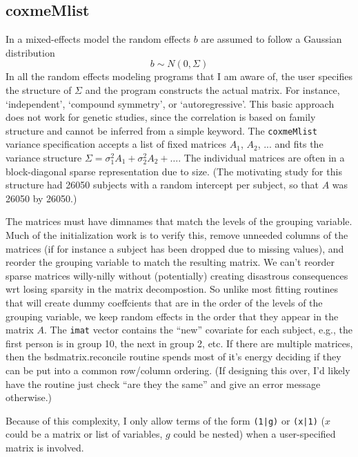 \documentclass{article}
\begin{document}
\subsection{coxmeMlist}
In a mixed-effects model the random effects $b$ are assumed to
follow a Gaussian distribution
$$
  b \sim N(0, \Sigma)
$$
In all the random effects modeling programs that I am aware of,
the user specifies the structure of $\Sigma$ and the program
constructs the actual matrix.  
For instance, `independent', `compound symmetry', or `autoregressive'.
This basic approach does not work for genetic studies, since the
correlation is based on family structure and cannot be inferred from
a simple keyword.
The \Verb!coxmeMlist! variance specification accepts a list of
fixed matrices $A_1$, $A_2$, ... and fits the variance
structure $\Sigma = \sigma_1^2 A_1 + \sigma_2^2 A_2 + \ldots$.
The individual matrices are often in a block-diagonal sparse 
representation due to size.
(The motivating study for this structure had 26050 subjects with a
random intercept per subject, so that $A$ was 26050 by 26050.)

The matrices must have dimnames that match the levels of the 
grouping variable.  Much of the initialization work is to verify
this, remove unneeded columns of the matrices (if for instance a
subject has been dropped due to missing values), and reorder the
grouping variable to match the resulting matrix. 
We can't reorder sparse matrices willy-nilly without (potentially)
creating disastrous consequences wrt losing sparsity in the
matrix decompostion.
So unlike most fitting routines that will create dummy coeffcients
that are in the order of the levels of the grouping variable, we
keep random effects in the order that they appear in the matrix $A$.  
The \Verb!imat! vector contains the ``new'' covariate for each subject,
e.g., the first person is in group 10, the next in group 2, etc.
If there are multiple matrices, then the bsdmatrix.reconcile routine
spends most of it's energy deciding if they can be put into a common
row/column ordering.  
(If designing this over, I'd likely have the routine just check ``are
they the same'' and give an error message otherwise.)

Because of this complexity, I only allow terms of the form
\Verb!(1|g)! or \Verb?(x|1)? ($x$ could be a matrix or list of variables,
$g$ could be nested) when a user-specified matrix is involved.
\end{document}
